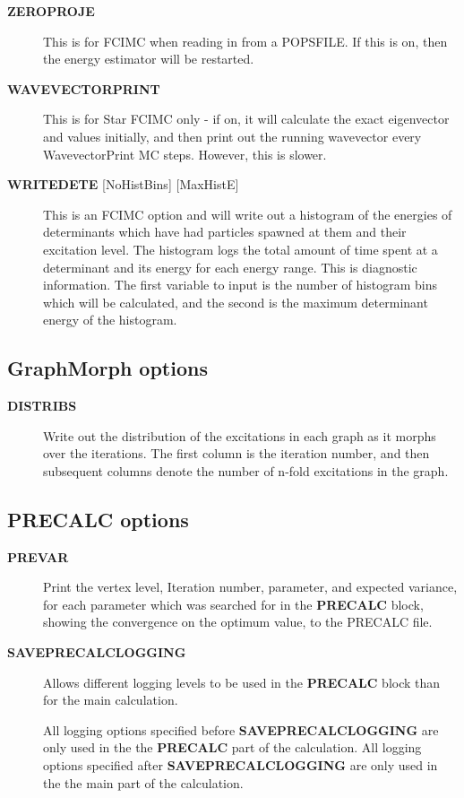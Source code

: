 \documentclass[openany,a4paper,10pt]{manual}
\begin{document}
\begin{description}
\item[\textbf{ZEROPROJE}]
This is for FCIMC when reading in from a POPSFILE. If this is on, then the energy
estimator will be restarted.

\item[\textbf{WAVEVECTORPRINT}]
This is for Star FCIMC only - if on, it will calculate the exact eigenvector and
values initially, and then print out the running wavevector every
WavevectorPrint MC steps. However, this is slower.

\item[\textbf{WRITEDETE} {[}NoHistBins{]} {[}MaxHistE{]}]
This is an FCIMC option and will write out a histogram of the energies of determinants which have
had particles spawned at them and their excitation level. The histogram logs the total
amount of time spent at a determinant and its energy for each energy range. This is diagnostic
information. The first variable to input is the number of histogram bins which will be calculated,
and the second is the maximum determinant energy of the histogram.

\end{description}


\subsection{GraphMorph options}
\begin{description}
\item[\textbf{DISTRIBS}]
Write out the distribution of the excitations in each graph as it
morphs over the iterations. The first column is the iteration number, and
then subsequent columns denote the number of n-fold excitations in
the graph.

\end{description}


\subsection{PRECALC options}
\begin{description}
\item[\textbf{PREVAR}]
Print the vertex level, Iteration number, parameter, and expected
variance, for each parameter which was searched for in the \textbf{PRECALC}
block, showing the convergence on the optimum value, to the PRECALC
file.

\item[\textbf{SAVEPRECALCLOGGING}]
Allows different logging levels to be used in the \textbf{PRECALC} block
than for the main calculation.

All logging options specified before \textbf{SAVEPRECALCLOGGING} are only
used in the the \textbf{PRECALC} part of the calculation.  All logging
options specified after  \textbf{SAVEPRECALCLOGGING} are only used in the
the main part of the calculation.

\end{description}
\end{document}
